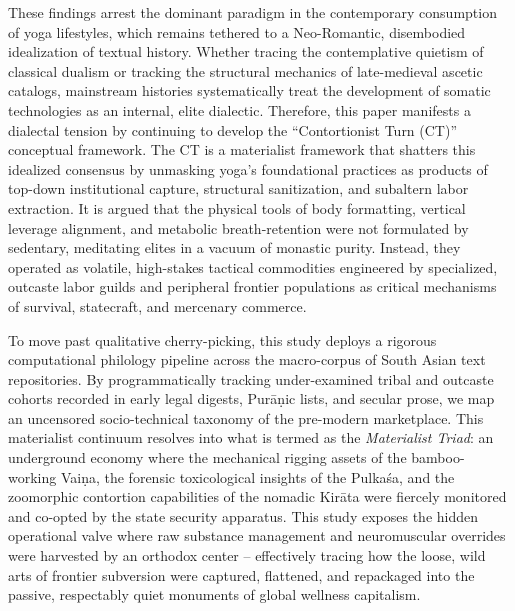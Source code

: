 \documentclass[11pt,twoside,letterpaper]{article}
\begin{document}
These findings arrest the dominant paradigm in the contemporary consumption of yoga lifestyles, which remains tethered to a Neo-Romantic, disembodied idealization of textual history. Whether tracing the contemplative quietism of classical dualism or tracking the structural mechanics of late-medieval ascetic catalogs, mainstream histories systematically treat the development of somatic technologies as an internal, elite dialectic. Therefore, this paper manifests a dialectal tension by continuing to develop the ``Contortionist Turn (CT)'' conceptual framework. The CT is a materialist framework that shatters this idealized consensus by unmasking yoga's foundational practices as products of top-down institutional capture, structural sanitization, and subaltern labor extraction. It is argued that the physical tools of body formatting, vertical leverage alignment, and metabolic breath-retention were not formulated by sedentary, meditating elites in a vacuum of monastic purity. Instead, they operated as volatile, high-stakes tactical commodities engineered by specialized, outcaste labor guilds and peripheral frontier populations as critical mechanisms of survival, statecraft, and mercenary commerce.

To move past qualitative cherry-picking, this study deploys a rigorous computational philology pipeline across the macro-corpus of South Asian text repositories. By programmatically tracking under-examined tribal and outcaste cohorts recorded in early legal digests, Purāṇic lists, and secular prose, we map an uncensored socio-technical taxonomy of the pre-modern marketplace. This materialist continuum resolves into what is termed as the \textit{Materialist Triad}: an underground economy where the mechanical rigging assets of the bamboo-working Vaiṇa, the forensic toxicological insights of the Pulkaśa, and the zoomorphic contortion capabilities of the nomadic Kirāta were fiercely monitored and co-opted by the state security apparatus. This study exposes the hidden operational valve where raw substance management and neuromuscular overrides were harvested by an orthodox center -- effectively tracing how the loose, wild arts of frontier subversion were captured, flattened, and repackaged into the passive, respectably quiet monuments of global wellness capitalism.
\end{document}
